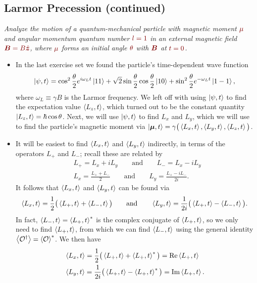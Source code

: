 \documentclass[11pt, a4paper]{article}
\newcommand{\dmath}[1]{\textcolor{Maroon}{#1}}  %
\newcommand{\eqtext}[1]{\qquad \text{#1} \qquad}
\renewcommand{\vec}[1]{\bm{#1}} %
\newcommand{\uvec}[1]{\hat{\vec{#1}}} %
\newcommand{\m}{\vec{\mu}}  %
\begin{document}
\subsection{Larmor Precession (continued)}
\textit{Analyze the motion of a quantum-mechanical particle with magnetic moment $ \dmath{\mu} $ and angular momentum quantum number $ \dmath{l = 1} $ in an external magnetic field $ \dmath{\vec{B} = B\uvec{z}} $, where $ \dmath{\mu} $ forms an initial angle $ \dmath{\theta} $ with $ \dmath{\vec{B}} $ at $ \dmath{t = 0} $.}
\begin{itemize}
	\item In the last exercise set we found the particle's time-dependent wave function
	\begin{equation*}
		\ket{\psi, t} =\cos^{2} \frac{\theta}{2} e^{i \omega_{L} t}\ket{11} + \sqrt{2}\sin \frac{\theta}{2} \cos \frac{\theta}{2} \ket{10} + \sin^{2}\frac{\theta}{2} e^{-\omega_{L} t}\ket{1 -1},
	\end{equation*}
	where $ \omega_{L} \equiv \gamma B $ is the Larmor frequency. We left off with using $ \ket{\psi, t} $ to find the expectation value $ \ev{L_{z}, t} $, which turned out to be the constant quantity $ \ket{L_{z}, t} = \hbar \cos \theta $. Next, we will use $ \ket{\psi, t} $ to find $ L_{x} $ and $ L_{y} $, which we will use to find the particle's magnetic moment via $ \ket{\m, t} = \gamma \big(\ev{L_{x}, t}, \ev{L_{y}, t}, \ev{L_{z}, t}\big) $.
	
	\item It will be easiest to find $ \ev{L_{x}, t} $ and $ \ev{L_{y}, t} $ indirectly, in terms of the operators $ L_{+} $ and $ L_{-} $; recall these are related by 
	\begin{align*}
		& L_{+} = L_{x} + iL_{y} \eqtext{and} L_{-} = L_{x} - i L_{y}\\
		& L_{x} = \frac{L_{+}+L_{-}}{2} \eqtext{and} L_{y} = \frac{L_{+} - iL_{-}}{2i}.
	\end{align*}
	It  follows that  $ \ev{L_{x}, t} $ and $ \ev{L_{y}, t} $ can be found via
	\begin{equation*}
		\ev{L_{x}, t} = \frac{1}{2}\big(\ev{L_{+}, t} + \ev{L_{-}, t} \big) \eqtext{and} \ev{L_{y}, t} = \frac{1}{2i}\big(\ev{L_{+}, t} - \ev{L_{-}, t} \big).
	\end{equation*}
	In fact, $ \ev{L_{-}, t} = \ev{L_{+}, t}^{*} $ is the complex conjugate of  $ \ev{L_{+}, t} $, so we only need to find $ \ev{L_{+}, t} $, from which we can find $ \ev{L_{-}, t} $ using the general identity $ \ev{\mathcal{O}^{\dagger}} = \ev{\mathcal{O}}^{*} $. We then have
	\begin{align*}
		& \ev{L_{x}, t} = \frac{1}{2}\big(\ev{L_{+}, t} + \ev{L_{+}, t}^{*} \big) = \Re \ev{L_{+}, t}\\
		& \ev{L_{y}, t} = \frac{1}{2i}\big(\ev{L_{+}, t} - \ev{L_{+}, t}^{*} \big) = \Im \ev{L_{+}, t}.
	\end{align*}
	

\end{itemize}
\end{document}
